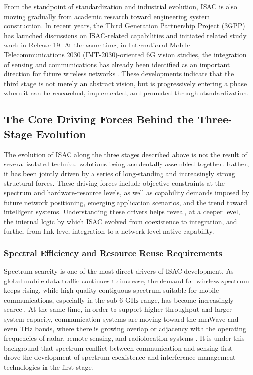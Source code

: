 From the standpoint of standardization and industrial evolution, ISAC is also moving gradually from academic research toward engineering system construction. In recent years, the Third Generation Partnership Project (3GPP) has launched discussions on ISAC-related capabilities and initiated related study work in Release 19. At the same time, in International Mobile Telecommunications 2030 (IMT-2030)-oriented 6G vision studies, the integration of sensing and communications has already been identified as an important direction for future wireless networks \cite{IMT2030Framework,ThreeGPPRel19ISAC}. These developments indicate that the third stage is not merely an abstract vision, but is progressively entering a phase where it can be researched, implemented, and promoted through standardization.

\subsection{The Core Driving Forces Behind the Three-Stage Evolution}
\label{subsec:ch1-evolution-driving-force}

The evolution of ISAC along the three stages described above is not the result of several isolated technical solutions being accidentally assembled together. Rather, it has been jointly driven by a series of long-standing and increasingly strong structural forces. These driving forces include objective constraints at the spectrum and hardware-resource levels, as well as capability demands imposed by future network positioning, emerging application scenarios, and the trend toward intelligent systems. Understanding these drivers helps reveal, at a deeper level, the internal logic by which ISAC evolved from coexistence to integration, and further from link-level integration to a network-level native capability.

\subsubsection{Spectral Efficiency and Resource Reuse Requirements}
\label{subsubsec:ch1-driving-force-spectrum}

Spectrum scarcity is one of the most direct drivers of ISAC development. As global mobile data traffic continues to increase, the demand for wireless spectrum keeps rising, while high-quality contiguous spectrum suitable for mobile communications, especially in the sub-6 GHz range, has become increasingly scarce \cite{ITU_R_RR2024,miit_radio_freq_2026_en,Saad2020Vision6G}. At the same time, in order to support higher throughput and larger system capacity, communication systems are moving toward the mmWave and even THz bands, where there is growing overlap or adjacency with the operating frequencies of radar, remote sensing, and radiolocation systems \cite{Liu2022ISAC}. It is under this background that spectrum conflict between communication and sensing first drove the development of spectrum coexistence and interference management technologies in the first stage.

